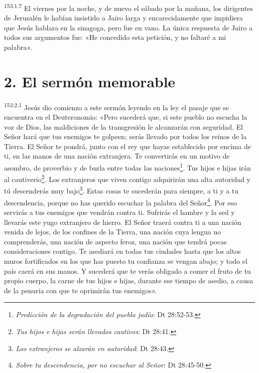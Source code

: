 \par 
\textsuperscript{153:1.7} El viernes por la noche, y de nuevo el sábado por la mañana, los dirigentes de Jerusalén le habían insistido a Jairo larga y encarecidamente que impidiera que Jesús hablara en la sinagoga, pero fue en vano. La única respuesta de Jairo a todos sus argumentos fue: «He concedido esta petición, y no faltaré a mi palabra».

\section*{2. El sermón memorable}
\par 
\textsuperscript{153:2.1} Jesús dio comienzo a este sermón leyendo en la ley el pasaje que se encuentra en el Deuteronomio: «Pero sucederá que, si este pueblo no escucha la voz de Dios, las maldiciones de la transgresión le alcanzarán con seguridad. El Señor hará que tus enemigos te golpeen; serás llevado por todos los reinos de la Tierra. El Señor te pondrá, junto con el rey que hayas establecido por encima de ti, en las manos de una nación extranjera. Te convertirás en un motivo de asombro, de proverbio y de burla entre todas las naciones\footnote{\textit{Predicción de la degradación del pueblo judío}: Dt 28:52-53.}. Tus hijos e hijas irán al cautiverio\footnote{\textit{Tus hijos e hijas serán llevados cautivos}: Dt 28:41.}. Los extranjeros que viven contigo adquirirán una alta autoridad y tú descenderás muy bajo\footnote{\textit{Los extranjeros se alzarán en autoridad}: Dt 28:43.}. Estas cosas te sucederán para siempre, a ti y a tu descendencia, porque no has querido escuchar la palabra del Señor\footnote{\textit{Sobre tu descendencia, por no escuchar al Señor}: Dt 28:45-50.}. Por eso servirás a tus enemigos que vendrán contra ti. Sufrirás el hambre y la sed y llevarás este yugo extranjero de hierro. El Señor traerá contra ti a una nación venida de lejos, de los confines de la Tierra, una nación cuya lengua no comprenderás, una nación de aspecto feroz, una nación que tendrá pocas consideraciones contigo. Te asediará en todas tus ciudades hasta que los altos muros fortificados en los que has puesto tu confianza se vengan abajo; y todo el país caerá en sus manos. Y sucederá que te verás obligado a comer el fruto de tu propio cuerpo, la carne de tus hijos e hijas, durante ese tiempo de asedio, a causa de la penuria con que te oprimirán tus enemigos».

